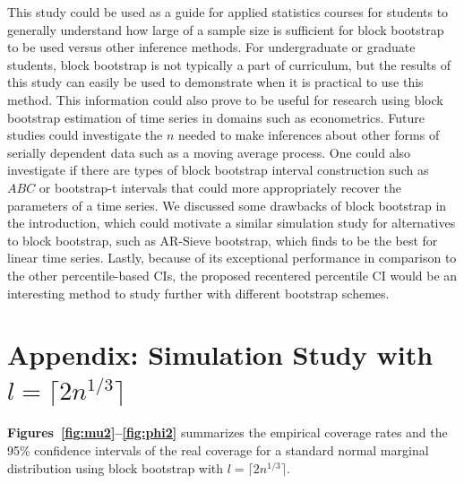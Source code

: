 \documentclass[10pt]{article}
\begin{document}
This study could be used as a guide for applied statistics courses for students
to generally understand how large of a sample size is sufficient for block
bootstrap to be used versus other inference methods. For undergraduate or 
graduate students, block bootstrap is not typically a part of curriculum, but
the results of this study can easily be used to demonstrate when it is practical 
to use this method. This information could also prove to be useful for research 
using block bootstrap estimation of time series in domains such as econometrics. 
Future studies could investigate the $n$ needed to make inferences about other 
forms of serially dependent data such as a moving average process. One could 
also investigate if there are types of block bootstrap interval construction 
such as $ABC$ or bootstrap-t intervals \citep{efron1993introduction} that could 
more
appropriately recover the parameters of a time series. We discussed some
drawbacks of block bootstrap in the introduction, which could motivate a similar
simulation study for alternatives to block bootstrap, such 
as AR-Sieve bootstrap, \citep{kreiss1992bootstrap} which 
\citet{buhlmann2002bootstraps} finds to be the best for linear time series. 
Lastly, because of its exceptional performance in comparison to the other 
percentile-based CIs, the proposed recentered percentile 
CI would be
an interesting method to study further with different bootstrap schemes.

\section*{Appendix: Simulation Study with $l = \lceil 2n^{1/3} \rceil$}

\textbf{Figures~\ref{fig:mu2}--\ref{fig:phi2}} 
summarizes the empirical coverage rates and the 95\% confidence intervals of the 
real coverage for a standard normal marginal distribution using block bootstrap
with $l = \lceil 2n^{1/3} \rceil$.
\end{document}
